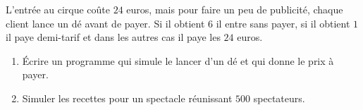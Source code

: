 
\begin{exercice}\label{exosmath-0604}

    L'entrée au cirque coûte \( 24\) euros, mais pour faire un peu de publicité, chaque client lance un dé avant de payer. Si il obtient \( 6\) il entre sans payer, si il obtient \( 1\) il paye demi-tarif et dans les autres cas il paye les \( 24\) euros.

    \begin{enumerate}
        \item
            Écrire un programme qui simule le lancer d'un dé et qui donne le prix à payer.
        \item
            Simuler les recettes pour un spectacle réunissant \( 500\) spectateurs.
    \end{enumerate}

\end{exercice}
